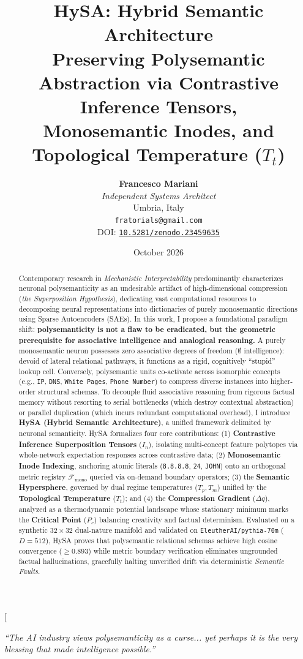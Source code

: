 \documentclass[10pt,twocolumn]{article}
\title{\vspace{-1.1cm}\textbf{\Large HySA: Hybrid Semantic Architecture \\ Preserving Polysemantic Abstraction via Contrastive Inference Tensors, \\ Monosemantic Inodes, and Topological Temperature \texorpdfstring{($T_t$)}{(Tt)}}}
\author{
    \textbf{Francesco Mariani} \\
    \textit{Independent Systems Architect} \\
    Umbria, Italy \\
    \texttt{fratorials@gmail.com} \\
    {\footnotesize DOI: \href{https://doi.org/10.5281/zenodo.23459635}{\texttt{10.5281/zenodo.23459635}}}
}
\date{October 2026}
\theoremstyle{definition}
\begin{document}
\twocolumn[
  \begin{@twocolumnfalse}
    \maketitle
    \begin{center}
        \vspace{-0.35cm}
        \textit{``The AI industry views polysemanticity as a curse... yet perhaps it is the very blessing that made intelligence possible.''}
        \vspace{0.25cm}
    \end{center}
    \begin{abstract}
      \noindent Contemporary research in \textit{Mechanistic Interpretability} predominantly characterizes neuronal polysemanticity as an undesirable artifact of high-dimensional compression (\textit{the Superposition Hypothesis}), dedicating vast computational resources to decomposing neural representations into dictionaries of purely monosemantic directions using Sparse Autoencoders (SAEs). In this work, I propose a foundational paradigm shift: \textbf{polysemanticity is not a flaw to be eradicated, but the geometric prerequisite for associative intelligence and analogical reasoning.} A purely monosemantic neuron possesses zero associative degrees of freedom ($\emptyset$ intelligence): devoid of lateral relational pathways, it functions as a rigid, cognitively ``stupid'' lookup cell. Conversely, polysemantic units co-activate across isomorphic concepts (e.g., \texttt{IP}, \texttt{DNS}, \texttt{White Pages}, \texttt{Phone Number}) to compress diverse instances into higher-order structural schemas. To decouple fluid associative reasoning from rigorous factual memory without resorting to serial bottlenecks (which destroy contextual abstraction) or parallel duplication (which incurs redundant computational overhead), I introduce \textbf{HySA (Hybrid Semantic Architecture)}, a unified framework delimited by neuronal semanticity. HySA formalizes four core contributions: (1) \textbf{Contrastive Inference Superposition Tensors} ($I_n$), isolating multi-concept feature polytopes via whole-network expectation responses across contrastive data; (2) \textbf{Monosemantic Inode Indexing}, anchoring atomic literals (\texttt{8.8.8.8}, \texttt{24}, \texttt{JOHN}) onto an orthogonal metric registry $\mathcal{F}_{\mathrm{mono}}$ queried via on-demand boundary operators; (3) the \textbf{Semantic Hypersphere}, governed by dual regime temperatures ($T_p, T_m$) unified by the \textbf{Topological Temperature} ($T_t$); and (4) the \textbf{Compression Gradient} ($\Delta q$), analyzed as a thermodynamic potential landscape whose stationary minimum marks the \textbf{Critical Point} ($P_c$) balancing creativity and factual determinism. Evaluated on a synthetic $32 \times 32$ dual-nature manifold and validated on \texttt{EleutherAI/pythia-70m} ($D=512$), HySA proves that polysemantic relational schemas achieve high cosine convergence ($\ge 0.893$) while metric boundary verification eliminates ungrounded factual hallucinations, gracefully halting unverified drift via deterministic \textit{Semantic Faults}.

\end{abstract}
\end{@twocolumnfalse}
\end{document}
